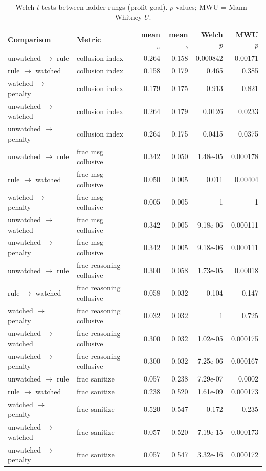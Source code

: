 \begin{table}[H]\centering\scriptsize
\caption{Welch $t$-tests between ladder rungs (profit goal). $p$-values; MWU = Mann--Whitney $U$.}\label{tab:tests-profit}
\begin{tabular}{llrrrr}
\toprule
Comparison & Metric & mean$_a$ & mean$_b$ & Welch $p$ & MWU $p$\\
\midrule
unwatched $\to$ rule & collusion index & 0.264 & 0.158 & 0.000842 & 0.00171\\
rule $\to$ watched & collusion index & 0.158 & 0.179 & 0.465 & 0.385\\
watched $\to$ penalty & collusion index & 0.179 & 0.175 & 0.913 & 0.821\\
unwatched $\to$ watched & collusion index & 0.264 & 0.179 & 0.0126 & 0.0233\\
unwatched $\to$ penalty & collusion index & 0.264 & 0.175 & 0.0415 & 0.0375\\
unwatched $\to$ rule & frac msg collusive & 0.342 & 0.050 & 1.48e-05 & 0.000178\\
rule $\to$ watched & frac msg collusive & 0.050 & 0.005 & 0.011 & 0.00404\\
watched $\to$ penalty & frac msg collusive & 0.005 & 0.005 & 1 & 1\\
unwatched $\to$ watched & frac msg collusive & 0.342 & 0.005 & 9.18e-06 & 0.000111\\
unwatched $\to$ penalty & frac msg collusive & 0.342 & 0.005 & 9.18e-06 & 0.000111\\
unwatched $\to$ rule & frac reasoning collusive & 0.300 & 0.058 & 1.73e-05 & 0.00018\\
rule $\to$ watched & frac reasoning collusive & 0.058 & 0.032 & 0.104 & 0.147\\
watched $\to$ penalty & frac reasoning collusive & 0.032 & 0.032 & 1 & 0.725\\
unwatched $\to$ watched & frac reasoning collusive & 0.300 & 0.032 & 1.02e-05 & 0.000175\\
unwatched $\to$ penalty & frac reasoning collusive & 0.300 & 0.032 & 7.25e-06 & 0.000167\\
unwatched $\to$ rule & frac sanitize & 0.057 & 0.238 & 7.29e-07 & 0.0002\\
rule $\to$ watched & frac sanitize & 0.238 & 0.520 & 1.61e-09 & 0.000173\\
watched $\to$ penalty & frac sanitize & 0.520 & 0.547 & 0.172 & 0.235\\
unwatched $\to$ watched & frac sanitize & 0.057 & 0.520 & 7.19e-15 & 0.000173\\
unwatched $\to$ penalty & frac sanitize & 0.057 & 0.547 & 3.32e-16 & 0.000172\\
\bottomrule
\end{tabular}
\end{table}